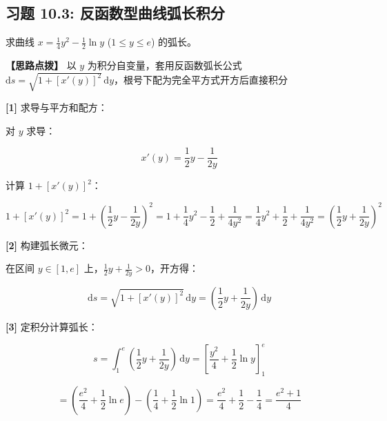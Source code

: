 \documentclass[11pt,a4paper,UTF8]{ctexart}
\begin{document}
\subsection{习题 10.3: 反函数型曲线弧长积分}

求曲线 $x = \frac{1}{4}y^2 - \frac{1}{2}\ln y$ ($1 \leqslant y \leqslant e$) 的弧长。

\textbf{\color{DeepPurple}【思路点拨】} 以 $y$ 为积分自变量，套用反函数弧长公式 $\mathrm{d}s = \sqrt{1+[x'(y)]^2}\,\mathrm{d}y$，根号下配为完全平方式开方后直接积分


\begin{solbox}[分步推导与答题规范]
\textbf{[1]} 求导与平方和配方：

对 $y$ 求导：


\begin{equation*}
x'(y) = \frac{1}{2}y - \frac{1}{2y}
\end{equation*}


计算 $1 + [x'(y)]^2$：


\begin{equation*}
1 + [x'(y)]^2 = 1 + \left(\frac{1}{2}y - \frac{1}{2y}\right)^2 = 1 + \frac{1}{4}y^2 - \frac{1}{2} + \frac{1}{4y^2} = \frac{1}{4}y^2 + \frac{1}{2} + \frac{1}{4y^2} = \left(\frac{1}{2}y + \frac{1}{2y}\right)^2
\end{equation*}


\textbf{[2]} 构建弧长微元：

在区间 $y \in [1, e]$ 上，$\frac{1}{2}y + \frac{1}{2y} > 0$，开方得：


\begin{equation*}
\mathrm{d}s = \sqrt{1+[x'(y)]^2}\,\mathrm{d}y = \left(\frac{1}{2}y + \frac{1}{2y}\right)\,\mathrm{d}y
\end{equation*}


\textbf{[3]} 定积分计算弧长：


\begin{equation*}
s = \int_1^e \left(\frac{1}{2}y + \frac{1}{2y}\right)\,\mathrm{d}y = \left[\frac{y^2}{4} + \frac{1}{2}\ln y\right]_1^e
\end{equation*}



\begin{equation*}
= \left(\frac{e^2}{4} + \frac{1}{2}\ln e\right) - \left(\frac{1}{4} + \frac{1}{2}\ln 1\right) = \frac{e^2}{4} + \frac{1}{2} - \frac{1}{4} = \frac{e^2+1}{4}
\end{equation*}

\end{solbox}
\end{document}
